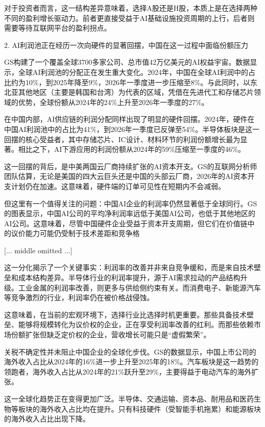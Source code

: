 \documentclass[11pt]{ctexart}
\begin{document}
对于投资者而言，这一结构差异意味着，选择A股还是H股，本质上是在选择两种不同的盈利增长驱动力。前者更直接受益于AI基础设施投资周期的上行，后者则需要等待互联网平台的盈利拐点。

2. AI利润池正在经历一次向硬件的显著回摆，中国在这一过程中面临份额压力

GS构建了一个覆盖全球3700多家公司、总市值42万亿美元的AI权益宇宙。数据显示，全球AI利润池的分配正在发生重大变化。2024年，中国在全球AI利润中的占比约为10\%，到2025年降至9\%，2026年一季度进一步压缩至8\%。与此同时，以东北亚其他地区（主要是韩国和台湾）为代表的区域，凭借在先进代工和存储芯片领域的优势，全球份额从2024年的24\%上升至2026年一季度的27\%。

在中国内部，AI供应链的利润分配同样出现了明显的硬件回摆。2024年，硬件在中国AI利润池中的占比为41\%，到2026年一季度已反弹至54\%。半导体板块是这一回摆的核心受益者，其中存储芯片、IC设计、材料环节的利润份额增长最为显著。相比之下，AI下游应用的利润份额从2024年的59\%压缩至一季度的46\%。

这一回摆的背后，是中美两国云厂商持续扩张的AI资本开支。GS的互联网分析师团队估算，无论是美国的四大云巨头还是中国的头部云厂商，2026年的AI资本开支计划仍在加速。这意味着，硬件端的订单可见性在短期内不会减弱。

但这里有一个值得关注的问题：中国AI企业的利润率仍然显著低于全球同行。GS的图表显示，中国AI公司的平均净利润率远低于美国AI公司，也低于其他地区的AI公司。这意味着，尽管中国硬件企业受益于资本开支周期，但它们在价值链中的议价能力可能仍受制于技术差距和竞争格

[... middle omitted ...]


这一分化揭示了一个关键事实：利润率的改善并非来自竞争缓和，而是来自技术壁垒和成本结构差异。半导体行业的利润率提升，源于AI需求拉动的产品结构升级。工业金属的利润率改善，则更多与供给侧约束有关。而消费电子、新能源汽车等竞争激烈的行业，利润率仍在被价格战侵蚀。

这意味着，在当前的宏观环境下，选择行业比选择时机更重要。那些具备技术壁垒、能够将规模转化为议价权的企业，正在享受利润率改善的红利。而那些依赖市场份额扩张但缺乏定价权的企业，营收增长可能只是“虚假繁荣”。

关税不确定性并未阻止中国企业的全球化步伐。GS的数据显示，中国上市公司的海外收入占比从2024年的16\%进一步上升至2025年的18\%。汽车板块是这一趋势的领跑者，海外收入占比从2024年的21\%跃升至29\%，主要得益于电动汽车的海外扩张。

这一全球化趋势正在变得更加广泛。半导体、交通运输、资本品、耐用品和医药生物等板块的海外收入占比均在提升。只有科技硬件（受智能手机拖累）和能源板块的海外收入占比出现下降。
\end{document}
